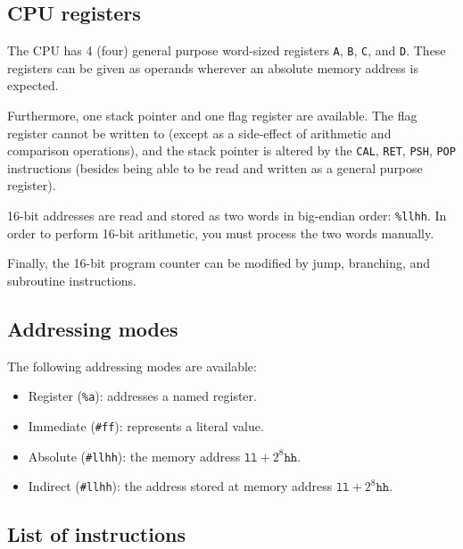 \documentclass[a5paper,onecolumn,final,10pt]{memoir}
\begin{document}
\subsection*{CPU registers}

The CPU has 4 (four) general purpose word-sized registers \texttt{A}, \texttt{B}, \texttt{C}, and \texttt{D}.
These registers can be given as operands wherever an absolute memory address is expected.

Furthermore, one stack pointer and one flag register are available.
The flag register cannot be written to (except as a side-effect of arithmetic and comparison operations),
and the stack pointer is altered by the \texttt{CAL}, \texttt{RET}, \texttt{PSH}, \texttt{POP} instructions
(besides being able to be read and written as a general purpose register).

16-bit addresses are read and stored as two words in big-endian order: \texttt{\%llhh}.
In order to perform 16-bit arithmetic, you must process the two words manually.\footnotemark


Finally, the 16-bit program counter can be modified by jump, branching, and subroutine instructions.

\subsection*{Addressing modes}

The following addressing modes are available:

\begin{itemize}[nosep]
	\item Register (\texttt{\%a}): addresses a named register.
	\item Immediate (\texttt{\#ff}): represents a literal value.
	\item Absolute (\texttt{\#llhh}): the memory address $\texttt{ll}+2^8\texttt{hh}$.
	\item Indirect (\texttt{\#llhh}): the address stored at memory address $\texttt{ll}+2^8\texttt{hh}$.
\end{itemize}

\subsection*{List of instructions}
\end{document}

